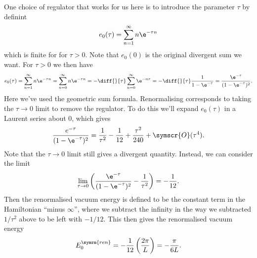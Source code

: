 \documentclass[fleqn]{NotesClass}
\newcommand{\order}{\symscr{O}}
\newcommand{\ren}{\symrm{ren}}
\begin{document}
    One choice of regulator that works for us here is to introduce the parameter \(\tau\) by definint
    \begin{equation}
        e_0(\tau) = \sum_{n=1}^{\infty} n\e^{-\tau n}
    \end{equation}
    which is finite for for \(\tau > 0\).
    Note that \(e_0(0)\) is the original divergent sum we want.
    For \(\tau > 0\) we then have
    \begin{equation*}
        e_0(\tau) = \sum_{n=1}^{\infty} n\e^{-\tau n} = \sum_{n=0}^{\infty} n\e^{-\tau n} = -\diff{}{\tau} \sum_{n=0}^{\infty} \e^{-n\tau} = -\diff{}{\tau} \frac{1}{1 - \e^{-\tau}} = \frac{\e^{-\tau}}{(1 - \e^{-\tau})^2}.
    \end{equation*}
    Here we've used the geometric sum formula.
    Renormalising corresponds to taking the \(\tau \to 0\) limit to remove the regulator.
    To do this we'll expand \(e_0(\tau)\) in a Laurent series about 0, which gives
    \begin{equation}
        \frac{e^{-\tau}}{(1 - \e^{-\tau})^2} = \frac{1}{\tau^2} - \frac{1}{12} + \frac{\tau^2}{240} + \order(\tau^4).
    \end{equation}
    Note that the \(\tau \to 0\) limit still gives a divergent quantity.
    Instead, we can consider the limit
    \begin{equation}
        \lim_{\tau \to 0} \left( \frac{\e^{-\tau}}{(1 - \e^{-\tau})^2} - \frac{1}{\tau^2} \right) = -\frac{1}{12}.
    \end{equation}
    Then the renormalised vacuum energy is defined to be the constant term in the Hamiltonian \enquote{minus \(\infty\)}, where we subtract the infinity in the way we subtracted \(1/\tau^2\) above to be left with \(-1/12\).
    This then gives the renormalised vacuum energy
    \begin{equation}
        E_0^{\ren} = -\frac{1}{12} \left( \frac{2\pi}{L} \right) = -\frac{\pi}{6L}.
    \end{equation}
    
\end{document}
